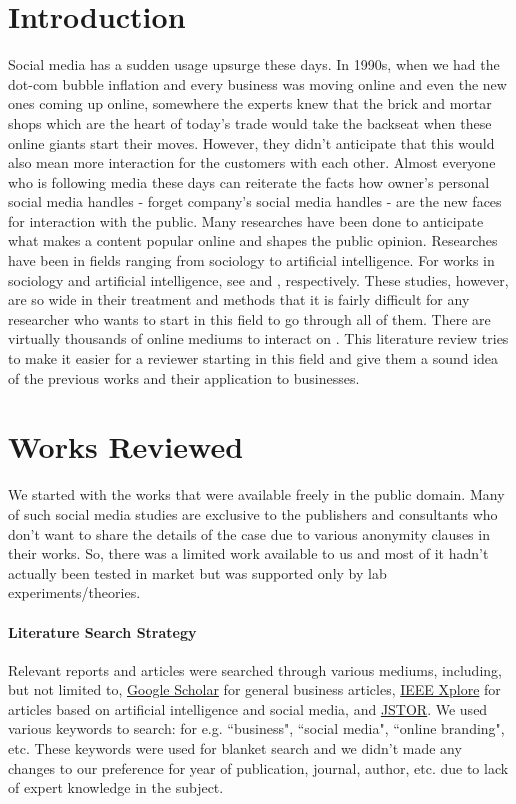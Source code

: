 \documentclass[12pt]{article}
\begin{document}
\section{Introduction}
Social media has a sudden usage upsurge these days. In 1990s, when we had the dot-com bubble inflation and every business was moving online and even the new ones coming up online, somewhere the experts knew that the brick and mortar shops which are the heart of today's trade would take the backseat when these online giants start their moves. However, they didn't anticipate that this would also mean more interaction for the customers with each other. Almost everyone who is following media these days can reiterate the facts how owner's personal social media handles - forget company's social media handles - are the new faces for interaction with the public. Many researches have been done to anticipate what makes a content popular online and shapes the public opinion. Researches have been in fields ranging from sociology to artificial intelligence. For works in sociology and artificial intelligence, see \cite{zeng2010} and \cite{wang2007}, respectively. These studies, however, are so wide in their treatment and methods that it is fairly difficult for any researcher who wants to start in this field to go through all of them. There are virtually thousands of online mediums to interact on \citep{harris2009}. This literature review tries to make it easier for a reviewer starting in this field and give them a sound idea of the previous works and their application to businesses.

\section{Works Reviewed}
We started with the works that were available freely in the public domain. Many of such social media studies are exclusive to the publishers and consultants who don't want to share the details of the case due to various anonymity clauses in their works. So, there was a limited work available to us and most of it hadn't actually been tested in market but was supported only by lab experiments/theories.

\paragraph{Literature Search Strategy}
Relevant reports and articles were searched through various mediums, including, but not limited to, \href{https://scholar.google.co.in/}{Google Scholar} for general business articles, \href{http://ieeexplore.ieee.org/Xplore/home.jsp}{IEEE Xplore} for articles based on artificial intelligence and social media, and \href{https://www.jstor.org/}{JSTOR}. We used various keywords to search: for e.g. ``business", ``social media", ``online branding", etc. These keywords were used for blanket search and we didn't made any changes to our preference for year of publication, journal, author, etc. due to lack of expert knowledge in the subject. 
\end{document}
